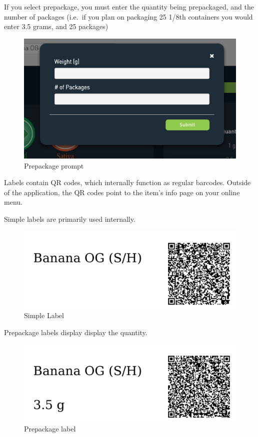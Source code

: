 \documentclass[]{book}
\theoremstyle{definition}
\theoremstyle{definition}
\theoremstyle{definition}
\theoremstyle{remark}
\begin{document}
If you select prepackage, you must enter the quantity being prepackaged,
and the number of packages (i.e.~if you plan on packaging 25 1/8th
containers you would enter 3.5 grams, and 25 packages)

\begin{figure}
\centering
\includegraphics{images/label2.png}
\caption{Prepackage prompt}
\end{figure}

Labels contain QR codes, which internally function as regular barcodes.
Outside of the application, the QR codes point to the item's info page
on your online menu.

Simple labels are primarily used internally.

\begin{figure}
\centering
\includegraphics{images/simplelabel.png}
\caption{Simple Label}
\end{figure}

Prepackage labels display display the quantity.

\begin{figure}
\centering
\includegraphics{images/prepackagelabel.png}
\caption{Prepackage label}
\end{figure}
\end{document}
